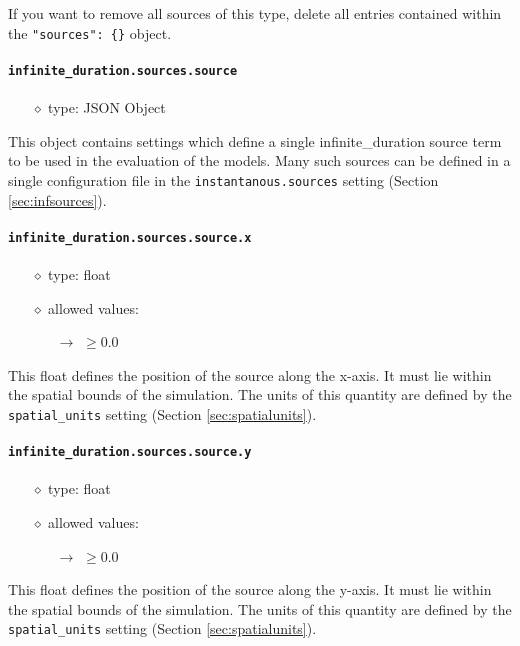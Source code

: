 \documentclass[]{article}
\def\code#1{\texttt{#1}}
\begin{document}
\noindent If you want to remove all sources of this type, delete all entries
contained within the \code{"sources": \{\}} object.

\paragraph{\code{infinite\_duration.sources.source}}\label{sec:infsource}
\begin{itemize}
    \item[$\diamond$] type: JSON Object 
\end{itemize}
This object contains settings which define a single infinite\_duration source term to
be used in the evaluation of the models. Many such sources can be defined in a
single configuration file in the \code{instantanous.sources} setting (Section
\ref{sec:infsources}).

\paragraph{\code{infinite\_duration.sources.source.x}}\label{sec:infsourcex}
\begin{itemize}
    \item[$\diamond$] type: float 
    \item[$\diamond$] allowed values:
    \begin{itemize}
        \item[$\rightarrow$] $\geq0.0$
    \end{itemize}
\end{itemize}
This float defines the position of the source along the x-axis. It must lie
within the spatial bounds of the simulation. The units of this quantity are
defined by the \code{spatial\_units} setting (Section \ref{sec:spatialunits}).

\paragraph{\code{infinite\_duration.sources.source.y}}\label{sec:infsourcey}
\begin{itemize}
    \item[$\diamond$] type: float 
    \item[$\diamond$] allowed values:
    \begin{itemize}
        \item[$\rightarrow$] $\geq0.0$
    \end{itemize}
\end{itemize}
This float defines the position of the source along the y-axis. It must lie
within the spatial bounds of the simulation. The units of this quantity are
defined by the \code{spatial\_units} setting (Section \ref{sec:spatialunits}).
\end{document}
